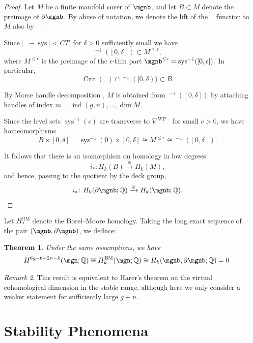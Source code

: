 \documentclass[12pt]{amsart}
\newtheorem{theorem}{Theorem}[section]
\theoremstyle{remark}
\newtheorem{remark}[theorem]{Remark}
\theoremstyle{definition}
\DeclareMathOperator{\crit}{Crit}
\DeclareMathOperator{\ind}{ind}
\DeclareMathOperator{\sys}{sys}
\DeclareMathOperator{\syst}{sys_T}
\numberwithin{equation}{section}
\begin{document}
\begin{proof}
Let $M$ be a finite manifold cover of $\mgnb$, and let $B \subset M$ denote the preimage of $\partial\mgnb$. By abuse of notation, we denote the lift of the $\syst$ function to $M$ also by $\syst$.  

Since $|\syst - \sys| < C T$, for $\delta>0$ sufficiently small we have
\[
\syst^{-1}([0,\delta]) \subset M^{\le\epsilon},
\]
where $M^{\le\epsilon}$ is the preimage of the $\epsilon$-thin part $\mgnb^{\le\epsilon} = \sys^{-1}([0,\epsilon])$. In particular,
\[
\crit(\syst) \cap \syst^{-1}([0,\delta)) \subset B.
\]

By Morse handle decomposition \cite{morse1959topologically,milnor2016morse}, $M$ is obtained from $\syst^{-1}([0,\delta])$ by attaching handles of index $m = \ind(g,n), \dots, \dim M$.  

Since the level sets $\sys^{-1}(c)$ are transverse to $\nabla^\text{WP}\syst$ for small $c>0$, we have homeomorphisms
\[
B\times [0,\delta] = \sys^{-1}(0)\times [0,\delta] \cong M^{\le\epsilon} \cong \syst^{-1}([0,\delta]).
\]

It follows that there is an isomorphism on homology in low degrees:
\[
i_* \colon H_k(B) \xrightarrow{\cong} H_k(M),
\]
and hence, passing to the quotient by the deck group,
\[
i_* \colon H_k(\partial\mgnb;\mathbb Q) \xrightarrow{\cong} H_k(\mgnb;\mathbb Q).
\]
\end{proof}


Let $H^\text{BM}_*$ denote the Borel--Moore homology. Taking the long exact sequence of the pair $(\mgnb, \partial\mgnb)$, we deduce:


\begin{theorem}
Under the same assumptions, we have
\[
H^{6g-6+2n-k}(\mgn;\mathbb Q) \cong H^\text{BM}_k(\mgn;\mathbb Q) \cong H_k(\mgnb, \partial\mgnb;\mathbb Q) = 0.
\]
\end{theorem}

\begin{remark}
This result is equivalent to Harer's theorem on the virtual cohomological dimension \cite{harer1986virtual} in the stable range, although here we only consider a weaker statement for sufficiently large $g+n$.
\end{remark}




\section{Stability Phenomena}
\label{sec:stability}
\end{document}
